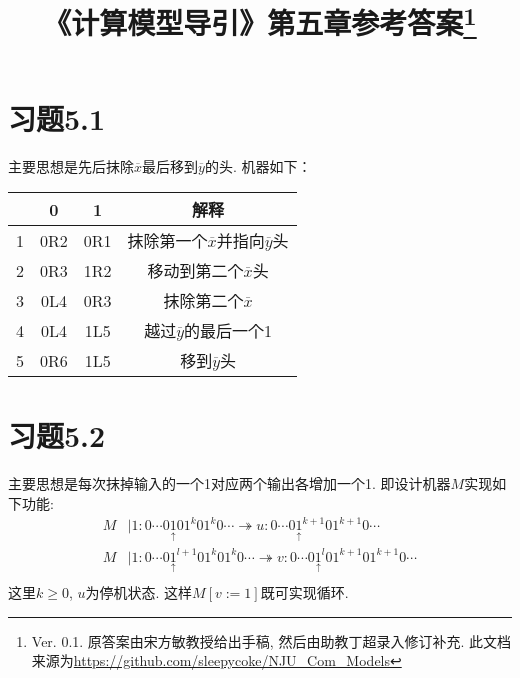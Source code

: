 \documentclass{article}
\newcommand*{\pt}[1]{\ensuremath{\underset{\uparrow}{#1}}}
\begin{document}
\title{《计算模型导引》第五章参考答案\footnote{Ver. 0.1. 原答案由宋方敏教授给出手稿, 然后由助教丁超录入修订补充. 此文档来源为\url{https://github.com/sleepycoke/NJU_Com_Models}}}
\maketitle

\section*{习题5.1}
主要思想是先后抹除$\overline x$最后移到$\overline y$的头. 
机器如下：
\begin{center}
	
\begin{tabular}{|c|c|c|c|}
	\hline
	&0&1&解释\\
	\hline
	1&0R2&0R1&抹除第一个$\overline x$并指向$\overline y$头\\
	2&0R3&1R2&移动到第二个$\overline x$头\\
	3&0L4&0R3&抹除第二个$\overline x$\\
	4&0L4&1L5&越过$\overline y$的最后一个1\\
	5&0R6&1L5&移到$\overline y$头\\
	\hline
\end{tabular}
\end{center}


\section*{习题5.2}
主要思想是每次抹掉输入的一个1对应两个输出各增加一个1. 
即设计机器$M$实现如下功能:\\
\begin{align*}
	M &| 1 : 0\cdots0\pt101^k01^k0\cdots \twoheadrightarrow u : 0\cdots0\pt1^{k+1}01^{k+1}0\cdots\\
	M &| 1 : 0\cdots0\pt1^{l+1}01^k01^k0\cdots \twoheadrightarrow v : 0\cdots0\pt1^l01^{k+1}01^{k+1}0\cdots\\
\end{align*}
这里$k\ge 0$, $u$为停机状态. 这样$M[v:=1]$既可实现循环. 
\end{document}
